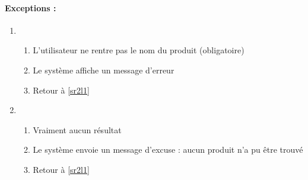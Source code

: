 \begin{boxedminipage}[t]{12cm}
	\paragraph*{Exceptions :}
	\begin{enumerate}
		\item
			\begin{enumerate}
				\item L'utilisateur ne rentre pas le nom du produit (obligatoire)
				\item Le système affiche un message d'erreur
				\item Retour à \ref{sr2l1}
			\end{enumerate}
		\item
			\begin{enumerate}
				\addtocounter{enumii}{3}
				\item Vraiment aucun résultat
				\item Le système envoie un message d'excuse : aucun produit n'a pu être trouvé
				\item Retour à \ref{sr2l1}
			\end{enumerate}
	\end{enumerate}
\end{boxedminipage}
\newpage
